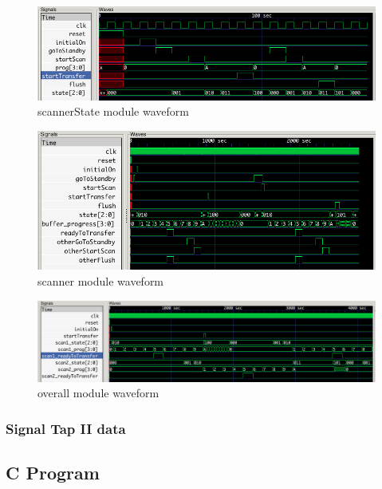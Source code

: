 \documentclass{article}
\begin{document}
      \begin{figure}[H]
        \centering
        \includegraphics[width=0.75\linewidth]{figures/gtkwave/scannerState_gtkwave.png}
        \caption{scannerState module waveform}
        \label{fig:scannerState_gtkwave}
      \end{figure}

      \begin{figure}[H]
        \centering
        \includegraphics[width=0.75\linewidth]{figures/gtkwave/scanner_gtkwave.png}
        \caption{scanner module waveform}
        \label{fig:scanner_gtkwave}
      \end{figure}

      \begin{figure}[H]
        \centering
        \includegraphics[width=0.75\linewidth]{figures/gtkwave/overall_gtkwave.png}
        \caption{overall module waveform}
        \label{fig:overall_gtkwave}
      \end{figure}

    \subsubsection{Signal Tap II data}

  \subsection{C Program}
    
    
\end{document}
